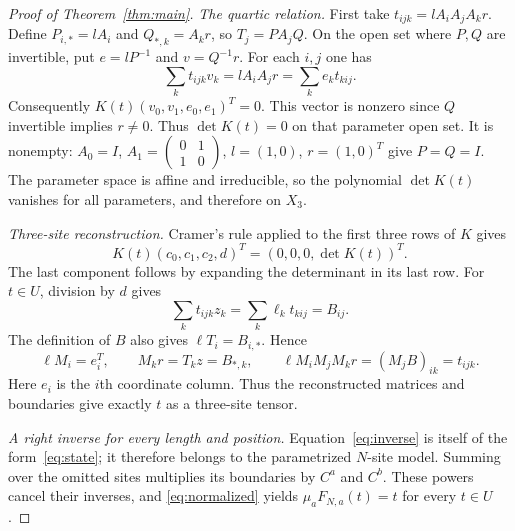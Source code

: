 \documentclass[11pt]{article}
\begin{document}
\begin{proof}[Proof of Theorem~\ref{thm:main}]
\emph{The quartic relation.}
First take $t_{ijk}=lA_iA_jA_kr$. Define
$P_{i,*}=lA_i$ and $Q_{*,k}=A_kr$, so $T_j=PA_jQ$.
On the open set where $P,Q$ are invertible, put
$e=lP^{-1}$ and $v=Q^{-1}r$. For each $i,j$ one has
\begin{equation}\label{eq:relation}
 \sum_k t_{ijk}v_k=lA_iA_jr=\sum_k e_kt_{kij}.
\end{equation}
Consequently $K(t)(v_0,v_1,e_0,e_1)^T=0$. This vector is nonzero since
$Q$ invertible implies $r\ne0$. Thus $\det K(t)=0$ on that parameter open
set. It is nonempty: $A_0=I$, $A_1=\left(\begin{smallmatrix}0&1\\1&0\end{smallmatrix}\right)$,
$l=(1,0)$, $r=(1,0)^T$ give $P=Q=I$. The parameter space is affine
and irreducible, so the polynomial $\det K(t)$ vanishes for all parameters,
and therefore on $X_3$.

\emph{Three-site reconstruction.}
Cramer's rule applied to the first three rows of $K$ gives
\begin{equation}\label{eq:cramer}
 K(t)(c_0,c_1,c_2,d)^T=(0,0,0,\det K(t))^T.
\end{equation}
The last component follows by expanding the determinant in its last row.
For $t\in U$, division by $d$ gives
\begin{equation}\label{eq:compatibility}
 \sum_k t_{ijk}z_k=\sum_k\ell_kt_{kij}=B_{ij}.
\end{equation}
The definition of $B$ also gives $\ell T_i=B_{i,*}$. Hence
\begin{equation}\label{eq:normalized}
 \ell M_i=e_i^T,\qquad M_kr=T_kz=B_{*,k},\qquad
 \ell M_iM_jM_kr=(M_jB)_{ik}=t_{ijk}.
\end{equation}
Here $e_i$ is the $i$th coordinate column. Thus the reconstructed matrices
and boundaries give exactly $t$ as a three-site tensor.

\emph{A right inverse for every length and position.}
Equation~\eqref{eq:inverse} is itself of the form~\eqref{eq:state}; it
therefore belongs to the parametrized $N$-site model. Summing over the
omitted sites multiplies its boundaries by $C^a$ and $C^b$.
These powers cancel their inverses, and \eqref{eq:normalized} yields
$\mu_aF_{N,a}(t)=t$ for every $t\in U$.


\end{proof}
\end{document}
